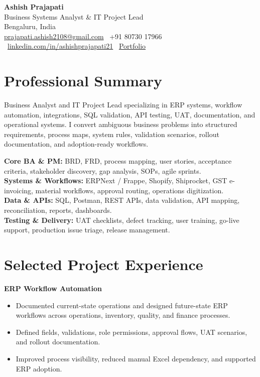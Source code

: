 \documentclass[10pt,a4paper]{article}
\begin{document}
{\Huge \textbf{Ashish Prajapati}}\\
{\large Business Systems Analyst \& IT Project Lead}\\
Bengaluru, India \\
\href{mailto:prajapati.ashish2108@gmail.com}{prajapati.ashish2108@gmail.com}
\textbar\ +91 80730 17966
\textbar\ \href{https://linkedin.com/in/ashishprajapati21}{linkedin.com/in/ashishprajapati21}
\textbar\ \href{https://itsmeashish2108.github.io/ashish-portfolio-site/}{Portfolio}

\section*{Professional Summary}
Business Analyst and IT Project Lead specializing in ERP systems, workflow automation, integrations, SQL validation, API testing, UAT, documentation, and operational systems. I convert ambiguous business problems into structured requirements, process maps, system rules, validation scenarios, rollout documentation, and adoption-ready workflows.

\textbf{Core BA \& PM:} BRD, FRD, process mapping, user stories, acceptance criteria, stakeholder discovery, gap analysis, SOPs, agile sprints.\\
\textbf{Systems \& Workflows:} ERPNext / Frappe, Shopify, Shiprocket, GST e-invoicing, material workflows, approval routing, operations digitization.\\
\textbf{Data \& APIs:} SQL, Postman, REST APIs, data validation, API mapping, reconciliation, reports, dashboards.\\
\textbf{Testing \& Delivery:} UAT checklists, defect tracking, user training, go-live support, production issue triage, release management.

\section*{Selected Project Experience}
\textbf{ERP Workflow Automation}
\begin{itemize}
  \item Documented current-state operations and designed future-state ERP workflows across operations, inventory, quality, and finance processes.
  \item Defined fields, validations, role permissions, approval flows, UAT scenarios, and rollout documentation.
  \item Improved process visibility, reduced manual Excel dependency, and supported ERP adoption.
\end{itemize}
\end{document}
